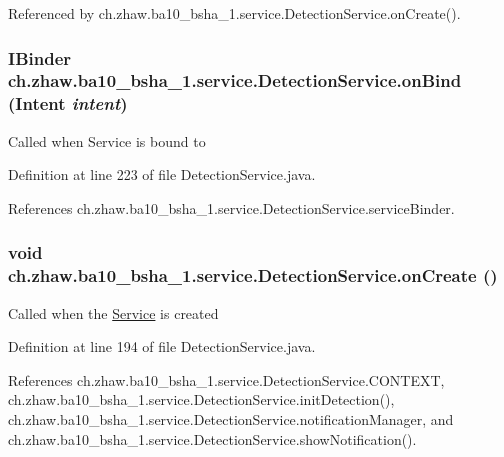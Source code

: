 Referenced by ch.zhaw.ba10\_\-bsha\_\-1.service.DetectionService.onCreate().\hypertarget{classch_1_1zhaw_1_1ba10__bsha__1_1_1service_1_1DetectionService_a4f03a6b3f16d1dfa20dafc02952681da}{
\subsubsection[{onBind}]{\setlength{\rightskip}{0pt plus 5cm}IBinder ch.zhaw.ba10\_\-bsha\_\-1.service.DetectionService.onBind (Intent {\em intent})}}
\label{classch_1_1zhaw_1_1ba10__bsha__1_1_1service_1_1DetectionService_a4f03a6b3f16d1dfa20dafc02952681da}
Called when Service is bound to 

Definition at line 223 of file DetectionService.java.

References ch.zhaw.ba10\_\-bsha\_\-1.service.DetectionService.serviceBinder.\hypertarget{classch_1_1zhaw_1_1ba10__bsha__1_1_1service_1_1DetectionService_a78b14ab8beb6bafa58ed1eb4c601d8a6}{
\subsubsection[{onCreate}]{\setlength{\rightskip}{0pt plus 5cm}void ch.zhaw.ba10\_\-bsha\_\-1.service.DetectionService.onCreate ()}}
\label{classch_1_1zhaw_1_1ba10__bsha__1_1_1service_1_1DetectionService_a78b14ab8beb6bafa58ed1eb4c601d8a6}
Called when the \hyperlink{}{Service} is created 

Definition at line 194 of file DetectionService.java.

References ch.zhaw.ba10\_\-bsha\_\-1.service.DetectionService.CONTEXT, ch.zhaw.ba10\_\-bsha\_\-1.service.DetectionService.initDetection(), ch.zhaw.ba10\_\-bsha\_\-1.service.DetectionService.notificationManager, and ch.zhaw.ba10\_\-bsha\_\-1.service.DetectionService.showNotification().

